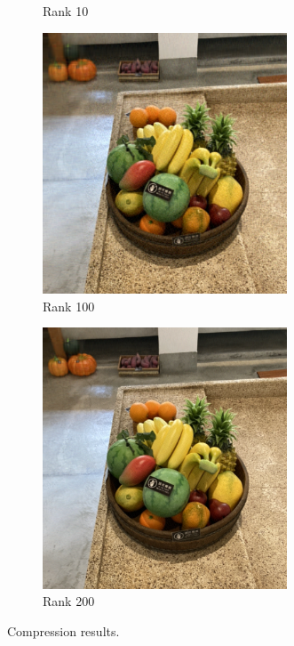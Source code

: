 \documentclass[12pt]{article}
\theoremstyle{definition}
\begin{document}
\begin{figure}[ht]
\begin{subfigure}[b]{0.45\textwidth}
         \caption{Rank 10}
         \label{fig:compression_10}
     \end{subfigure}
     \centering
     \begin{subfigure}[b]{0.45\textwidth}
         \centering
         \includegraphics[width=0.8\textwidth]{ch2_figures/result_compression_fruit_100.png}
         \caption{Rank 100}
         \label{fig:compression_100}
     \end{subfigure}
     \hfill
     \begin{subfigure}[b]{0.45\textwidth}
         \centering
         \includegraphics[width=0.8\textwidth]{ch2_figures/result_compression_fruit_200.png}
         \caption{Rank 200}
         \label{fig:compression_200}
     \end{subfigure}
     \caption{Compression results.}
     \label{fig:compressed_fruits}
\end{figure}
\end{document}
